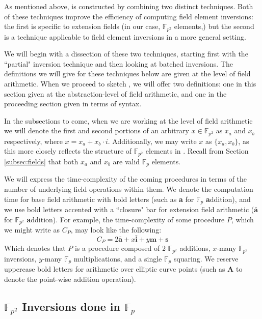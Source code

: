 As mentioned above,  is constructed by combining two distinct techniques. Both of these techniques improve the efficiency of computing field element inversions: the first is specific to extension fields (in our case, $\mathbb{F}_{p^{2}}$ elements,) but the second is a technique applicable to field element inversions in a more general setting.

We will begin with a dissection of these two techniques, starting first with the ``partial" inversion technique and then looking at batched inversions. The definitions we will give for these techniques below are given at the level of field arithmetic. When we proceed to sketch , we will offer two definitions: one in this section given at the abstraction-level of field arithmetic, and one in the proceeding section given in terms of \sidh syntax.

In the subsections to come, when we are working at the level of field arithmetic we will denote the first and second portions of an arbitrary $x \in \mathbb{F}_{p^{2}}$ as $x_{a}$ and $x_{b}$ respectively, where $x = x_{a} + x_{b}\cdot i$. Additionally, we may write $x$ as $\{x_{a}, x_{b}\}$, as this more closely reflects the structure of $\mathbb{F}_{p^{2}}$ elements in \sidh. Recall from Section \ref{subsec:fields} that both $x_{a}$ and $x_{b}$ are valid $\mathbb{F}_{p}$ elements. 

We will express the time-complexity of the coming procedures in terms of the number of underlying field operations within them. We denote the computation time for base field arithmetic with bold letters (such as \textbf{a} for $\mathbb{F}_p$ \textbf{a}ddition), and we use bold letters accented with a ``closure" bar for extension field arithmetic ($\bar{\textbf{a}}$ for $\mathbb{F}_{p^2}$ \textbf{a}ddition). For example, the time-complexity of some procedure $P$, which we might write as $C_{P}$, may look like the following:
$$
C_{P} = 2\bar{\textbf{a}} + x\bar{\textbf{i}} + y\textbf{m} + \textbf{s}
$$
Which denotes that $P$ is a procedure composed of 2 $\mathbb{F}_{p^{2}}$ additions, $x$-many $\mathbb{F}_{p^{2}}$ inversions, $y$-many $\mathbb{F}_{p}$ multiplications, and a single $\mathbb{F}_{p}$ squaring. We reserve uppercase bold letters for arithmetic over elliptic curve points (such as \textbf{A} to denote the point-wise addition operation).

\subsection{$\mathbb{F}_{p^{2}}$ Inversions done in $\mathbb{F}_{p}$}
\label{subsec:partialinv}

